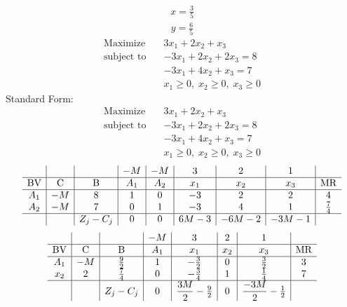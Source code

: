 \documentclass{article}
\begin{document}
\begin{align*}
x=\frac{3}{5}\end{align*}
\begin{align*}
y=\frac{6}{5}\end{align*}
\begin{align*}
\text{Maximize} \quad & 3x_{1} + 2x_{2} + x_{3}\\
\text{subject to} \quad
& -3x_{1} + 2x_{2} + 2x_{3}=8\\
& -3x_{1} + 4x_{2} + x_{3}=7\\
& x_{1}\ge0,\; x_{2}\ge0,\; x_{3}\ge0\end{align*}
Standard Form:\\
\begin{align*}
\text{Maximize} \quad & 3x_{1} + 2x_{2} + x_{3}\\
\text{subject to} \quad
& -3x_{1} + 2x_{2} + 2x_{3}=8\\
& -3x_{1} + 4x_{2} + x_{3}=7\\
& x_{1}\ge0,\; x_{2}\ge0,\; x_{3}\ge0\end{align*}
\begin{align*}
\begin{array}{c|c|c|c|c|c|c|c|c}
 &  &  & -M & -M & 3 & 2 & 1 & \\
\hline
\text{BV} & \text{C} & \text{B} & A_{1} & A_{2} & x_{1} & x_{2} & x_{3} & \text{MR} \\
\hline
A_{1} & -M & 8 & 1 & 0 & -3 & 2 & 2 & 4 \\
A_{2} & -M & 7 & 0 & 1 & -3 & 4 & 1 & \frac{7}{4} \\
\hline
 &  & Z_j-C_j & 0 & 0 & 6M - 3 & -6M - 2 & -3M - 1 & \\
\end{array}
\end{align*}
\begin{align*}
\begin{array}{c|c|c|c|c|c|c|c}
 &  &  & -M & 3 & 2 & 1 & \\
\hline
\text{BV} & \text{C} & \text{B} & A_{1} & x_{1} & x_{2} & x_{3} & \text{MR} \\
\hline
A_{1} & -M & \frac{9}{2} & 1 & -\frac{3}{2} & 0 & \frac{3}{2} & 3 \\
x_{2} & 2 & \frac{7}{4} & 0 & -\frac{3}{4} & 1 & \frac{1}{4} & 7 \\
\hline
 &  & Z_j-C_j & 0 & \dfrac{3M}{2} - \frac{9}{2} & 0 & \dfrac{-3M}{2} - \frac{1}{2} & \\
\end{array}
\end{align*}
\end{document}
